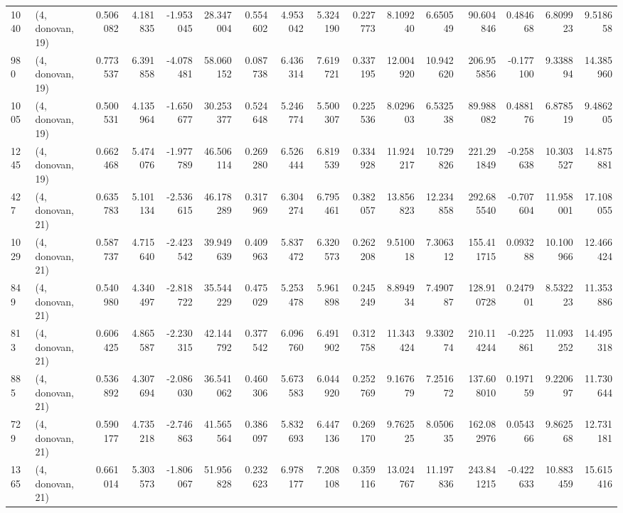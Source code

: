 \begin{tabular}{llrrrrrrrrrrrrrr}
1040 &  (4, donovan, 19) &   0.506082 &   4.181835 &  -1.953045 &     28.347004 &    0.554602 &    4.953042 &    5.324190 &  0.227773 &   8.109240 &   6.650549 &    90.604846 &   0.484668 &   6.809923 &   9.518658 \\
980  &  (4, donovan, 19) &   0.773537 &   6.391858 &  -4.078481 &     58.060152 &    0.087738 &    6.436314 &    7.619721 &  0.337195 &  12.004920 &  10.942620 &   206.955856 &  -0.177100 &   9.338894 &  14.385960 \\
1005 &  (4, donovan, 19) &   0.500531 &   4.135964 &  -1.650677 &     30.253377 &    0.524648 &    5.246774 &    5.500307 &  0.225536 &   8.029603 &   6.532538 &    89.988082 &   0.488176 &   6.878519 &   9.486205 \\
1245 &  (4, donovan, 19) &   0.662468 &   5.474076 &  -1.977789 &     46.506114 &    0.269280 &    6.526444 &    6.819539 &  0.334928 &  11.924217 &  10.729826 &   221.291849 &  -0.258638 &  10.303527 &  14.875881 \\
427  &  (4, donovan, 21) &   0.635783 &   5.101134 &  -2.536615 &     46.178289 &    0.317969 &    6.304274 &    6.795461 &  0.382057 &  13.856823 &  12.234858 &   292.685540 &  -0.707604 &  11.958001 &  17.108055 \\
1029 &  (4, donovan, 21) &   0.587737 &   4.715640 &  -2.423542 &     39.949639 &    0.409963 &    5.837472 &    6.320573 &  0.262208 &   9.510018 &   7.306312 &   155.411715 &   0.093288 &  10.100966 &  12.466424 \\
849  &  (4, donovan, 21) &   0.540980 &   4.340497 &  -2.818722 &     35.544229 &    0.475029 &    5.253478 &    5.961898 &  0.245249 &   8.894934 &   7.490787 &   128.910728 &   0.247901 &   8.532223 &  11.353886 \\
813  &  (4, donovan, 21) &   0.606425 &   4.865587 &  -2.230315 &     42.144792 &    0.377542 &    6.096760 &    6.491902 &  0.312758 &  11.343424 &   9.330274 &   210.114244 &  -0.225861 &  11.093252 &  14.495318 \\
885  &  (4, donovan, 21) &   0.536892 &   4.307694 &  -2.086030 &     36.541062 &    0.460306 &    5.673583 &    6.044920 &  0.252769 &   9.167679 &   7.251672 &   137.608010 &   0.197159 &   9.220697 &  11.730644 \\
729  &  (4, donovan, 21) &   0.590177 &   4.735218 &  -2.746863 &     41.565564 &    0.386097 &    5.832693 &    6.447136 &  0.269170 &   9.762525 &   8.050635 &   162.082976 &   0.054366 &   9.862568 &  12.731181 \\
1365 &  (4, donovan, 21) &   0.661014 &   5.303573 &  -1.806067 &     51.956828 &    0.232623 &    6.978177 &    7.208108 &  0.359116 &  13.024767 &  11.197836 &   243.841215 &  -0.422633 &  10.883459 &  15.615416 \\

\end{tabular}
